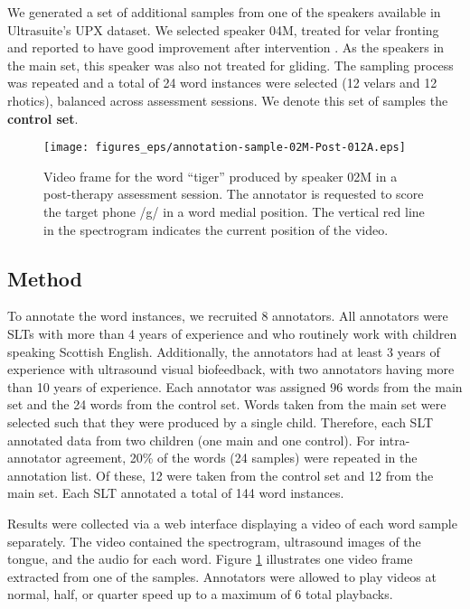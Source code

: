 We generated a set of additional samples from one of the speakers available in Ultrasuite's UPX dataset.
We selected speaker 04M, treated for velar fronting and reported to have good improvement after intervention \citep{cleland2019enabling}.
As the speakers in the main set, this speaker was also not treated for gliding.
The sampling process was repeated and a total of 24 word instances were selected (12 velars and 12 rhotics), balanced across assessment sessions.
We denote this set of samples the \textbf{control set}.


\begin{figure}
\texttt{[image: figures\_eps/annotation-sample-02M-Post-012A.eps]}
\caption{\label{fig:annotation-video-sample} Video frame for the word \enquote{tiger} produced by speaker 02M in a post-therapy assessment session. The annotator is requested to score the target phone /g/ in a word medial position. The vertical red line in the spectrogram indicates the current position of the video.}
\end{figure}


\subsection{Method}
\label{subsec_expert_method}

To annotate the word instances, we recruited 8 annotators.
All annotators were SLTs with more than 4 years of experience and who routinely work with children speaking Scottish English.
Additionally, the annotators had at least 3 years of experience with ultrasound visual biofeedback, with two annotators having more than 10 years of experience.
Each annotator was assigned 96 words from the main set and the 24 words from the control set.
Words taken from the main set were selected such that they were produced by a single child.
Therefore, each SLT annotated data from two children (one main and one control).
For intra-annotator agreement, 20\% of the words (24 samples) were repeated in the annotation list.
Of these, 12 were taken from the control set and 12 from the main set.
Each SLT annotated a total of 144 word instances.

Results were collected via a web interface displaying a video of each word sample separately.
The video contained the spectrogram, ultrasound images of the tongue, and the audio for each word.
Figure \ref{fig:annotation-video-sample} illustrates one video frame extracted from one of the samples.
Annotators were allowed to play videos at normal, half, or quarter speed up to a maximum of 6 total playbacks. 

